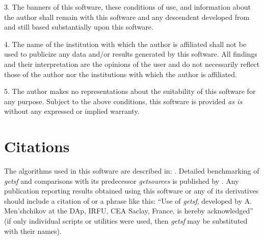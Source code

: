 \documentclass[a4paper,10pt]{article}
\begin{document}
\vspace{0.5mm}
3. The banners of this software, these conditions of use, and information about the author shall remain with this software and
any descendent developed from and still based substantially upon this software.

\vspace{0.5mm}
4. The name of the institution with which the author is affiliated shall not be used to publicize any data and/or results
generated by this software. All findings and their interpretation are the opinions of the user and do not necessarily reflect those
of the author nor the institutions with which the author is affiliated.

\vspace{0.5mm} 
5. The author makes no representations about the suitability of this software for any purpose. Subject to the above conditions, 
this software is provided \emph{as is} without any expressed or implied warranty.

\section{Citations}
\label{citations}

The algorithms used in this software are described in:
\cite{Men'shchikov2021getsf,Men'shchikov2017,Men'shchikov2016,Men'shchikov2013,
Palmeirim_etal2013,Men'shchikov_etal2012,Men'shchikov_etal2010}. Detailed benchmarking of \textsl{getsf} and comparisons with its
predecessor \textsl{getsources} \citep{Men'shchikov_etal2012} is published by \cite{Men'shchikov2021bench}. Any publication
reporting results obtained using this software or any of its derivatives should include a citation of \cite{Men'shchikov2021getsf}
or a phrase like this: ``Use of \textsl{getsf}, developed by A. Men'shchikov at the DAp, IRFU, CEA Saclay, France, is hereby
acknowledged'' (if only individual scripts or utilities were used, then \textsl{getsf} may be substituted with their names).




\end{document}
